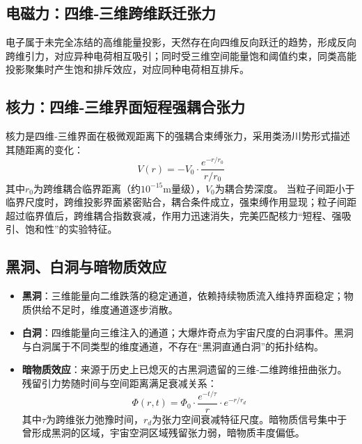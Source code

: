 \documentclass[UTF8]{csoarticle}
\begin{document}
\subsection{电磁力：四维‑三维跨维跃迁张力}
电子属于未完全冻结的高维能量投影，天然存在向四维反向跃迁的趋势，形成反向跨维引力，对应异种电荷相互吸引；同时受三维空间能量饱和阈值约束，同类高能投影聚集时产生饱和排斥效应，对应同种电荷相互排斥。

\subsection{核力：四维‑三维界面短程强耦合张力}
核力是四维‑三维界面在极微观距离下的强耦合束缚张力，采用类汤川势形式描述其随距离的变化：
\begin{equation}
V(r) = -V_0 \cdot \frac{e^{-r/r_0}}{r/r_0}
\end{equation}
其中$r_0$为跨维耦合临界距离（约$10^{-15}\text{m}$量级），$V_0$为耦合势深度。
当粒子间距小于临界尺度时，跨维投影界面紧密贴合，耦合条件成立，强束缚作用显现；粒子间距超过临界值后，跨维耦合指数衰减，作用力迅速消失，完美匹配核力“短程、强吸引、饱和性”的实验特征。

\subsection{黑洞、白洞与暗物质效应}
\begin{itemize}
\item \textbf{黑洞}：三维能量向二维跌落的稳定通道，依赖持续物质流入维持界面稳定；物质供给不足时，维度通道逐步消散。
\item \textbf{白洞}：四维能量向三维注入的通道；大爆炸奇点为宇宙尺度的白洞事件。黑洞与白洞属于不同类型的维度通道，不存在“黑洞直通白洞”的拓扑结构。
\item \textbf{暗物质效应}：来源于历史上已熄灭的古黑洞遗留的三维‑二维跨维扭曲张力。残留引力势随时间与空间距离满足衰减关系：
\begin{equation}
\Phi(r,t) = \Phi_0 \cdot \frac{e^{-t/\tau}}{r} \cdot e^{-r/r_d}
\end{equation}
其中$\tau$为跨维张力弛豫时间，$r_d$为张力空间衰减特征尺度。暗物质信号集中于曾形成黑洞的区域，宇宙空洞区域残留张力弱，暗物质丰度偏低。
\end{itemize}
\end{document}
